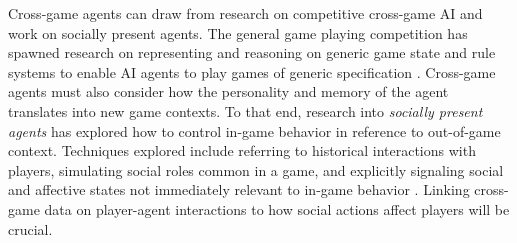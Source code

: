 \documentclass[conference]{IEEEtran}
\newcommand{\mytodo}[1]{\textbf{[[#1]]}}
\begin{document}
Cross-game agents can draw from research on competitive cross-game AI and work on socially present agents. 
The general game playing competition has spawned research on representing and reasoning on generic game state and rule systems to enable AI agents to play games of generic specification \cite{genesereth2005:general-game-playing}.
Cross-game agents must also consider how the personality and memory of the agent translates into new game contexts.
To that end, research into {\em socially present agents} has explored how to control in-game behavior in reference to out-of-game context. 
Techniques explored include referring to historical interactions with players, simulating social roles common in a game, and explicitly signaling social and affective states not immediately relevant to in-game behavior \cite{pereira2012:soc-boardgame}.
Linking cross-game data on player-agent interactions to how social actions affect players will be crucial.
%
%
\end{document}
